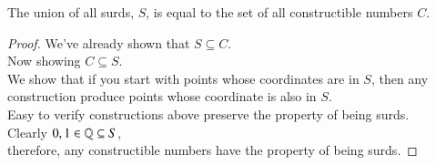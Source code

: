 \documentclass[10pt]{article}
\begin{document}
		\begin{theorem}
			The union of all surds, $S$, is equal to the set of all constructible numbers $C$.
			\begin{proof}
				We've already shown that $S \subseteq C$. \\
				Now showing $C \subseteq S$. \\
				We show that if you start with points whose coordinates are in $S$, then any construction produce points whose coordinate is also in $S$. \\
				Easy to verify constructions above preserve the property of being surds. \\
				Clearly $0, 1 \in \mathbb{Q} \subseteq S$, \\
				therefore, any constructible numbers have the property of being surds.
			\end{proof}
		\end{theorem}
		
\end{document}
